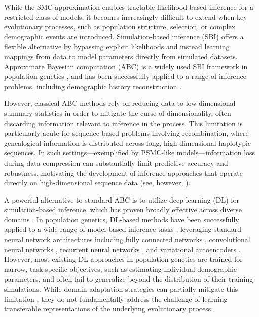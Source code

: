 \documentclass{article}
\let\citep\parencite
\begin{document}
While the SMC approximation enables tractable likelihood-based inference for a restricted class of models, 
it becomes increasingly difficult to extend when key evolutionary processes, such as population structure, selection, or complex demographic events are introduced. 
Simulation-based inference (SBI) offers a flexible alternative by bypassing explicit likelihoods 
and instead learning mappings from data to model parameters directly from simulated datasets.
Approximate Bayesian computation (ABC) is  a widely used SBI framework in population genetics \citep[e.g.][]{beaumont_approximate_2002}, and has been successfully applied to a range of inference problems, including demographic history reconstruction \citep[e.g.][]{boitard_inferring_2016, jay_abc_2019}. 

However, classical ABC methods rely on reducing data to low-dimensional summary statistics 
in order to mitigate the curse of dimensionality, 
often discarding information relevant to inference in the process. 
This limitation is particularly acute for sequence-based problems involving recombination, 
where genealogical information is distributed across long, high-dimensional haplotypic sequences. 
In such settings—exemplified by PSMC-like models—information loss during data compression can substantially limit
predictive accuracy and robustness, 
motivating the development of inference approaches that operate directly on high-dimensional sequence data (see, 
however, \citep{min2025neural}).

A powerful alternative to standard ABC is to utilize deep learning (DL) for simulation-based inference, which has
proven broadly effective across diverse domains \citep{schmidhuber_annotated_2022}. 
In population genetics, DL-based methods have been successfully applied to a wide range of model-based inference tasks \citep[as reviewed in][]{korfmann_deep_2023}, 
leveraging standard neural network architectures including fully connected networks \citep{sheehan2016deep,battey_predicting_2020},
convolutional neural networks \citep{kern2018diplos, flagel_unreasonable_2019, torada_imagene_2019, sanchez_deep_2021, whitehouse2023timesweeper, smith2023dispersal, smith2023dispersenn2, nait_saada_inference_2023}, recurrent neural networks \citep{adrion2020predicting}, and
variational autoencoders \citep{battey2021visualizing}. 
However, most existing DL approaches in population genetics are trained for narrow, task-specific objectives,
such as estimating individual demographic parameters,
and often fail to generalize beyond the distribution of their training simulations. 
While domain adaptation strategies can partially mitigate this limitation \citep[e.g.][]{mo2023domain}, 
they do not fundamentally address the challenge of learning transferable representations of the underlying evolutionary process.
\end{document}
